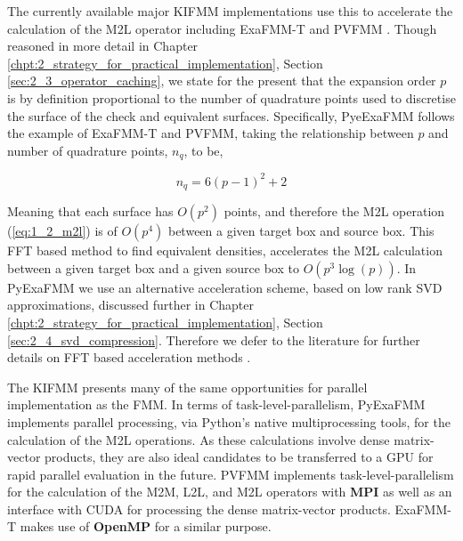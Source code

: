 The currently available major \gls{KIFMM} implementations use this to accelerate the calculation of the
\gls{M2L} operator including ExaFMM-T and PVFMM \cite{Malhotra:2015:CCP, exafmm}.  Though
reasoned in more detail in Chapter \ref{chpt:2_strategy_for_practical_implementation}, Section \ref{sec:2_3_operator_caching}, we state for
the present that the expansion order $p$ is by definition proportional to the
number of quadrature points used to discretise the surface of the check and
equivalent surfaces. Specifically, PyeExaFMM follows the example of ExaFMM-T and
PVFMM, taking the relationship between $p$ and number of quadrature points, $n_q$,
to be,

\begin{equation}
    n_q = 6(p-1)^2 + 2
\end{equation}

Meaning that each surface has $O(p^2)$ points, and therefore the \gls{M2L} operation
(\ref{eq:1_2_m2l}) is of $O(p^4)$ between a given target box and source box.
This FFT based method to find equivalent densities, accelerates the \gls{M2L} calculation between a given target box
and a given source box to $O(p^3 \log(p))$. In PyExaFMM we use an alternative
acceleration scheme, based on low rank SVD approximations, discussed further in
Chapter \ref{chpt:2_strategy_for_practical_implementation}, Section \ref{sec:2_4_svd_compression}. Therefore we defer to the
literature for further details on FFT based acceleration methods \cite{Malhotra:2015:CCP}.

The \gls{KIFMM} presents many of the same opportunities for parallel implementation
as the \gls{FMM}. In terms of \gls{task-level-parallelism}, PyExaFMM implements
parallel processing, via Python's native multiprocessing tools, for the calculation
of the \gls{M2L} operations. As these calculations involve dense matrix-vector products,
they are also ideal candidates to be transferred
to a \gls{GPU} for rapid parallel evaluation in the future. PVFMM implements
\gls{task-level-parallelism} for the calculation of the M2M, L2L, and M2L
operators with \textbf{\gls{MPI}} as well as an interface with \gls{CUDA} for
processing the dense matrix-vector products. ExaFMM-T makes use of
\textbf{\gls{OpenMP}} for a similar purpose.

